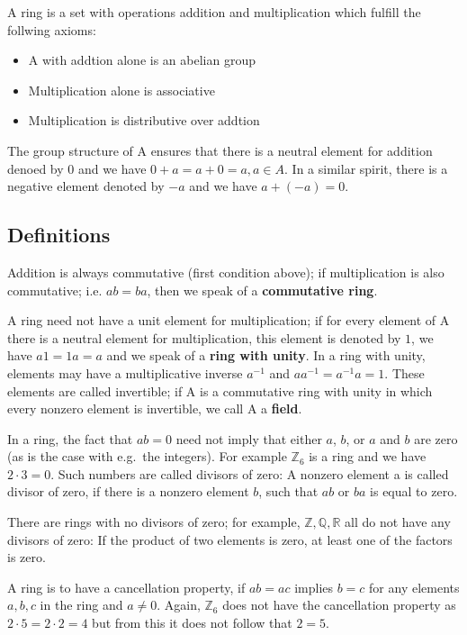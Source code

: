 
A ring is a set with operations addition and multiplication which
fulfill the follwing axioms:

\begin{itemize}
\item
  A with addtion alone is an abelian group
\item
  Multiplication alone is associative
\item
  Multiplication is distributive over addtion
\end{itemize}

The group structure of A ensures that there is a neutral element for
addition denoed by 0 and we have \(0 + a = a + 0 = a, a \in A\). In a
similar spirit, there is a negative element denoted by \(-a\) and we
have \(a + (-a) = 0\).

\subsection{Definitions}\label{definitions}

Addition is always commutative (first condition above); if
multiplication is also commutative; i.e. \(ab = ba\), then we speak of a
\textbf{commutative ring}.

A ring need not have a unit element for multiplication; if for every
element of A there is a neutral element for multiplication, this element
is denoted by \(1\), we have \(a1 = 1a = a\) and we speak of a
\textbf{ring with unity}. In a ring with unity, elements may have a
multiplicative inverse \(a^{-1}\) and \(a a^{-1} = a^{-1} a = 1\). These
elements are called invertible; if A is a commutative ring with unity in
which every nonzero element is invertible, we call A a \textbf{field}.

In a ring, the fact that \(ab = 0\) need not imply that either \(a\),
\(b\), or \(a\) and \(b\) are zero (as is the case with e.g.~the
integers). For example \(\mathbb{Z}_6\) is a ring and we have
\(2 \cdot 3 = 0\). Such numbers are called divisors of zero: A nonzero
element a is called divisor of zero, if there is a nonzero element
\(b\), such that \(ab\) or \(ba\) is equal to zero.

There are rings with no divisors of zero; for example,
\(\mathbb{Z}, \mathbb{Q}, \mathbb{R}\) all do not have any divisors of
zero: If the product of two elements is zero, at least one of the
factors is zero.

A ring is to have a cancellation property, if \(ab = ac\) implies
\(b=c\) for any elements \(a,b,c\) in the ring and \(a \neq 0\). Again,
\(\mathbb{Z}_6\) does not have the cancellation property as
\(2 \cdot 5 = 2 \cdot 2 = 4\) but from this it does not follow that
\(2 = 5\).

